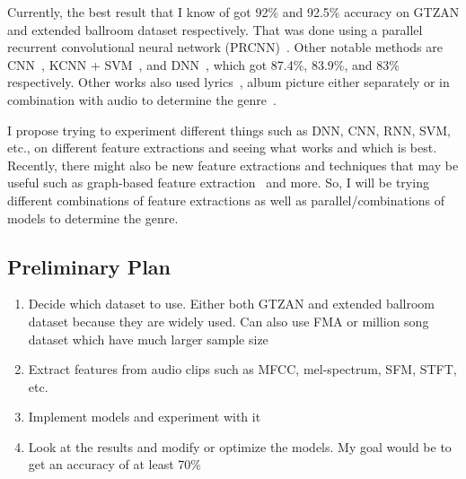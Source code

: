 \documentclass[10pt,twocolumn,letterpaper]{article}
\begin{document}
	Currently, the best result that I know of got 92\% and 92.5\% accuracy on GTZAN and extended ballroom dataset respectively. That was done using a parallel recurrent convolutional neural network (PRCNN)~\cite{yang2020parallel}. Other notable methods are CNN~\cite{zhang2016improved}, KCNN + SVM~\cite{zhang2015deep}, and DNN~\cite{sigtia2014improved}, which got 87.4\%, 83.9\%, and 83\% respectively. Other works also used lyrics~\cite{tsaptsinos2017lyrics}, album picture either separately or in combination with audio to determine the genre~\cite{oramas2017multi}.
	
	I propose trying to experiment different things such as DNN, CNN, RNN, SVM, etc., on different feature extractions and seeing what works and which is best. Recently, there might also be new feature extractions and techniques that may be useful such as graph-based feature extraction~\cite{melo2020graph} and more. So, I will be trying different combinations of feature extractions as well as parallel/combinations of models to determine the genre.
	
	\subsection{Preliminary Plan}
	
		\begin{enumerate}
			\item Decide which dataset to use. Either both GTZAN and extended ballroom dataset because they are widely used. Can also use FMA or million song dataset which have much larger sample size
			\item Extract features from audio clips such as MFCC, mel-spectrum, SFM, STFT, etc.
			\item Implement models and experiment with it
			\item Look at the results and modify or optimize the models. My goal would be to get an accuracy of at least 70\%
		\end{enumerate}
	
	{\small
		
		
	}
	
\end{document}
